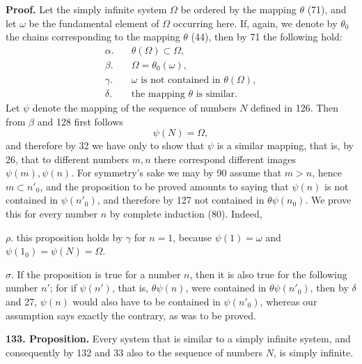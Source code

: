 \documentclass[11pt]{article}
\newcommand{\partof}{\mathrel{\subset}}
\begin{document}
\noindent\textbf{Proof.} Let the simply infinite system $\Omega$ be ordered by the mapping $\theta$ (71), and let $\omega$ be the fundamental element of $\Omega$ occurring here. If, again, we denote by $\theta_0$ the chains corresponding to the mapping $\theta$ (44), then by 71 the following hold:
\begin{align*}
\alpha.\quad& \theta(\Omega)\partof\Omega,\\
\beta.\quad& \Omega=\theta_0(\omega),\\
\gamma.\quad& \omega\text{ is not contained in }\theta(\Omega),\\
\delta.\quad& \text{the mapping }\theta\text{ is similar.}
\end{align*}
Let $\psi$ denote the mapping of the sequence of numbers $N$ defined in 126. Then from $\beta$ and 128 first follows
\[
\psi(N)=\Omega,
\]
and therefore by 32 we have only to show that $\psi$ is a similar mapping, that is, by 26, that to different numbers $m,n$ there correspond different images $\psi(m),\psi(n)$. For symmetry's sake we may by 90 assume that $m>n$, hence $m\partof n'_0$, and the proposition to be proved amounts to saying that $\psi(n)$ is not contained in $\psi(n'_0)$, and therefore by 127 not contained in $\theta\psi(n_0)$. We prove this for every number $n$ by complete induction (80). Indeed,

\noindent $\rho.$ this proposition holds by $\gamma$ for $n=1$, because $\psi(1)=\omega$ and $\psi(1_0)=\psi(N)=\Omega$.

\noindent $\sigma.$ If the proposition is true for a number $n$, then it is also true for the following number $n'$; for if $\psi(n')$, that is, $\theta\psi(n)$, were contained in $\theta\psi(n'_0)$, then by $\delta$ and 27, $\psi(n)$ would also have to be contained in $\psi(n'_0)$, whereas our assumption says exactly the contrary, as was to be proved.

\noindent\textbf{133. Proposition.} Every system that is similar to a simply infinite system, and consequently by 132 and 33 also to the sequence of numbers $N$, is simply infinite.
\end{document}
